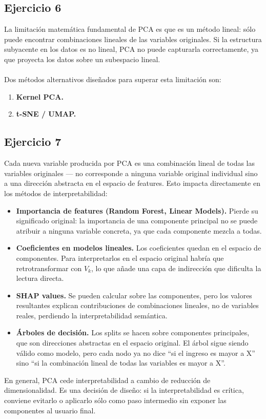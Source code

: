 \documentclass[a4paper,12pt]{article}
\begin{document}
\subsection*{Ejercicio 6}
\noindent La limitación matemática fundamental de PCA es que es un método lineal: sólo puede encontrar combinaciones lineales de las variables originales. Si la estructura subyacente en los datos es no lineal, PCA no puede capturarla correctamente, ya que proyecta los datos sobre un subespacio lineal. \\
\\
\noindent Dos métodos alternativos diseñados para superar esta limitación son:
\begin{enumerate}
	\item \textbf{Kernel PCA.}
	\item \textbf{t-SNE / UMAP.}
\end{enumerate}
\subsection*{Ejercicio 7}
\noindent Cada nueva variable producida por PCA es una combinación lineal de todas las variables originales --- no corresponde a ninguna variable original individual sino a una dirección abstracta en el espacio de features. Esto impacta directamente en los métodos de interpretabilidad:
\begin{itemize}
	\item \textbf{Importancia de features (Random Forest, Linear Models).} Pierde su significado original: la importancia de una componente principal no se puede atribuir a ninguna variable concreta, ya que cada componente mezcla a todas.
	\item \textbf{Coeficientes en modelos lineales.} Los coeficientes quedan en el espacio de componentes. Para interpretarlos en el espacio original habría que retrotransformar con $V_k$, lo que añade una capa de indirección que dificulta la lectura directa.
	\item \textbf{SHAP values.} Se pueden calcular sobre las componentes, pero los valores resultantes explican contribuciones de combinaciones lineales, no de variables reales, perdiendo la interpretabilidad semántica.
	\item \textbf{Árboles de decisión.} Los splits se hacen sobre componentes principales, que son direcciones abstractas en el espacio original. El árbol sigue siendo válido como modelo, pero cada nodo ya no dice ``si el ingreso es mayor a X'' sino ``si la combinación lineal de todas las variables es mayor a X''.
\end{itemize}
\noindent En general, PCA cede interpretabilidad a cambio de reducción de dimensionalidad. Es una decisión de diseño: si la interpretabilidad es crítica, conviene evitarlo o aplicarlo sólo como paso intermedio sin exponer las componentes al usuario final.
\end{document}
